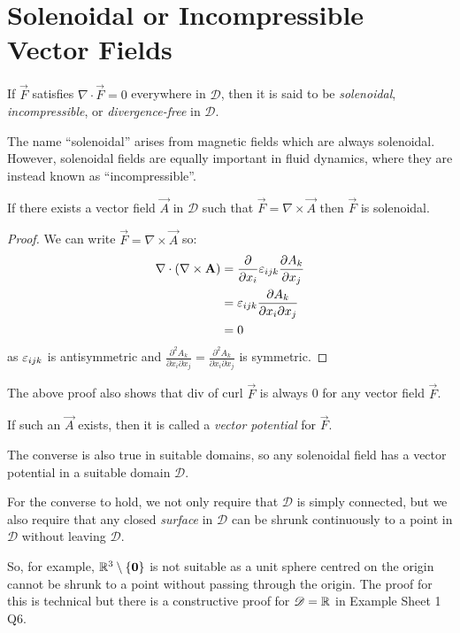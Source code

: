 \documentclass[../main.tex]{subfiles}
\begin{document}
\section{Solenoidal or Incompressible Vector Fields}
\label{solenoidalFields}
\begin{definition}[Solenoidal]
  If $\vec{F}$ satisfies $\nabla \cdot \vec{F} = 0$ everywhere in $\mathscr{D}$, then it is said to be \textit{solenoidal}, \textit{incompressible}, or \textit{divergence-free} in $\mathscr{D}$.
\end{definition}
\begin{remark}[Nomenclature]
  The name ``solenoidal'' arises from magnetic fields which are always solenoidal.
  However, solenoidal fields are equally important in fluid dynamics, where they are instead known as ``incompressible''.
\end{remark}
\begin{proposition}
  If there exists a vector field $\vec{A}$ in $\mathscr{D}$ such that $\vec{F} = \nabla \times \vec{A}$ then $\vec{F}$ is solenoidal.
\end{proposition}
\begin{proof}
  We can write $\vec{F} = \nabla \times \vec{A}$ so:
  \begin{align*}
    \nabla \cdot (\nabla \times \vec{A}) &= \pderiv{}{x_i} \levi_{i j k} \pderiv{A_k}{x_j} \\
                                         &= \levi_{i j k} \frac{\partial A_k}{\partial x_i \partial x_j} \\
                                         &= 0
  \end{align*}
  as $\varepsilon_{i j k}$ is antisymmetric and $\frac{\partial^2 A_k}{\partial x_i \partial x_j} = \frac{\partial^2 A_k}{\partial x_i \partial x_j}$ is symmetric.
\end{proof}
\begin{remark}
  The above proof also shows that div of curl $\vec{F}$ is always 0 for any vector field $\vec{F}$.
\end{remark}
If such an $\vec{A}$ exists, then it is called a \textit{vector potential} for $\vec{F}$.

The converse is also true in suitable domains, so any solenoidal field has a vector potential in a suitable domain $\mathscr{D}$.
\begin{remark}
  \nonexaminable
  For the converse to hold, we not only require that $\mathscr{D}$ is simply connected, but we also require that any closed \textit{surface} in $\mathscr{D}$ can be shrunk continuously to a point in $\mathscr{D}$ without leaving $\mathscr{D}$.

  So, for example, $\mathbb{R}^3 \setminus \{\mathbf{\bm{0}}\}$ is not suitable as a unit sphere centred on the origin cannot be shrunk to a point without passing through the origin.
  The proof for this is technical but there is a constructive proof for $\mathscr{D} = \mathbb{R}$ in Example Sheet 1 Q6.
\end{remark}
\end{document}
